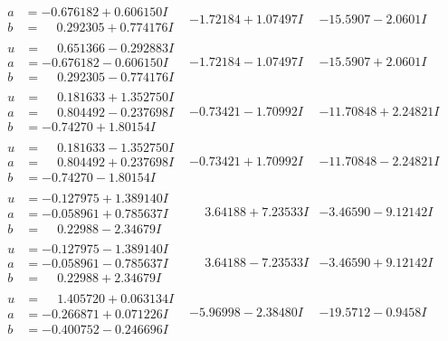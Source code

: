\documentclass[1p]{elsarticle_modified}
\theoremstyle{definition}
\begin{document}
$$\begin{array}{c|c|c}
\begin{aligned}
a &= -0.676182 + 0.606150 I \\
b &= \phantom{-}0.292305 + 0.774176 I\end{aligned}
 & -1.72184 + 1.07497 I & -15.5907 - 2.0601 I \\ \hline\begin{aligned}
u &= \phantom{-}0.651366 - 0.292883 I \\
a &= -0.676182 - 0.606150 I \\
b &= \phantom{-}0.292305 - 0.774176 I\end{aligned}
 & -1.72184 - 1.07497 I & -15.5907 + 2.0601 I \\ \hline\begin{aligned}
u &= \phantom{-}0.181633 + 1.352750 I \\
a &= \phantom{-}0.804492 - 0.237698 I \\
b &= -0.74270 + 1.80154 I\end{aligned}
 & -0.73421 - 1.70992 I & -11.70848 + 2.24821 I \\ \hline\begin{aligned}
u &= \phantom{-}0.181633 - 1.352750 I \\
a &= \phantom{-}0.804492 + 0.237698 I \\
b &= -0.74270 - 1.80154 I\end{aligned}
 & -0.73421 + 1.70992 I & -11.70848 - 2.24821 I \\ \hline\begin{aligned}
u &= -0.127975 + 1.389140 I \\
a &= -0.058961 + 0.785637 I \\
b &= \phantom{-}0.22988 - 2.34679 I\end{aligned}
 & \phantom{-}3.64188 + 7.23533 I & -3.46590 - 9.12142 I \\ \hline\begin{aligned}
u &= -0.127975 - 1.389140 I \\
a &= -0.058961 - 0.785637 I \\
b &= \phantom{-}0.22988 + 2.34679 I\end{aligned}
 & \phantom{-}3.64188 - 7.23533 I & -3.46590 + 9.12142 I \\ \hline\begin{aligned}
u &= \phantom{-}1.405720 + 0.063134 I \\
a &= -0.266871 + 0.071226 I \\
b &= -0.400752 - 0.246696 I\end{aligned}
 & -5.96998 - 2.38480 I & -19.5712 - 0.9458 I \\ \hline\begin{aligned}

\end{aligned}
\end{array}$$
\end{document}
